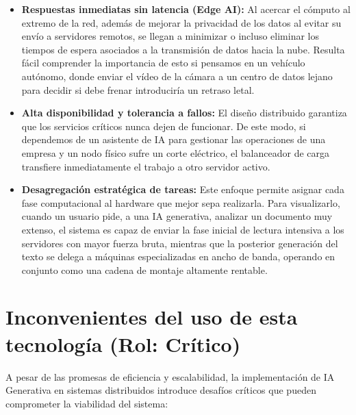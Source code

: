 \documentclass[runningheads]{llncs}
\begin{document}
\begin{itemize}
	\newline
	\item \textbf{Respuestas inmediatas sin latencia (Edge AI):} Al acercar el cómputo al extremo de la red, además de mejorar la privacidad de los datos al evitar su envío a servidores remotos, se llegan a minimizar o incluso eliminar los tiempos de espera asociados a la transmisión de datos hacia la nube. Resulta fácil comprender la importancia de esto si pensamos en un vehículo autónomo, donde enviar el vídeo de la cámara a un centro de datos lejano para decidir si debe frenar introduciría un retraso letal.
	\newline
	\item \textbf{Alta disponibilidad y tolerancia a fallos:} El diseño distribuido garantiza que los servicios críticos nunca dejen de funcionar. De este modo, si dependemos de un asistente de IA para gestionar las operaciones de una empresa y un nodo físico sufre un corte eléctrico, el balanceador de carga transfiere inmediatamente el trabajo a otro servidor activo.
	\newline
	\item \textbf{Desagregación estratégica de tareas:} Este enfoque permite asignar cada fase computacional al hardware que mejor sepa realizarla. Para visualizarlo, cuando un usuario pide, a una IA generativa, analizar un documento muy extenso, el sistema es capaz de enviar la fase inicial de lectura intensiva a los servidores con mayor fuerza bruta, mientras que la posterior generación del texto se delega a máquinas especializadas en ancho de banda, operando en conjunto como una cadena de montaje altamente rentable.
\end{itemize}

\section{Inconvenientes del uso de esta tecnología (Rol: Crítico)}
A pesar de las promesas de eficiencia y escalabilidad, la implementación de IA Generativa en sistemas distribuidos introduce desafíos críticos que pueden comprometer la viabilidad del sistema:
\end{document}
